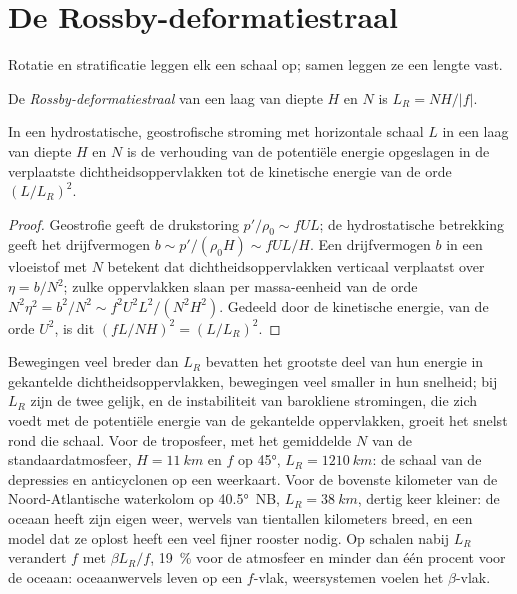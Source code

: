 \section{De Rossby-deformatiestraal}\label{sec:b3:gfd-foundations:rossby-radius}

Rotatie en stratificatie leggen elk een schaal op; samen leggen ze
een lengte vast.

\begin{definition}\label{def:b3:gfd-foundations:rossby-radius}
De \emph{Rossby-deformatiestraal}
van een laag van diepte $H$ en  $N$ is $L_R = NH/|f|$.
\end{definition}

\begin{proposition}\label{prop:b3:gfd-foundations:rossby-radius}
In een hydrostatische, geostrofische stroming met horizontale schaal $L$ in een laag van
diepte $H$ en  $N$ is de verhouding van de potentiële energie
opgeslagen in de verplaatste dichtheidsoppervlakken tot de kinetische energie
van de orde $(L/L_R)^2$.
\end{proposition}

\begin{proof}
Geostrofie geeft de drukstoring $p'/\rho_0 \sim fUL$; de
hydrostatische betrekking geeft het drijfvermogen $b \sim p'/(\rho_0H) \sim fUL/H$. Een
drijfvermogen $b$ in een vloeistof met  $N$ betekent dat dichtheidsoppervlakken
verticaal verplaatst over $\eta = b/N^2$; zulke oppervlakken slaan per
massa-eenheid van de orde $N^2\eta^2 = b^2/N^2 \sim f^2U^2L^2/(N^2H^2)$. Gedeeld
door de kinetische energie, van de orde $U^2$, is dit $(fL/NH)^2 = (L/L_R)^2$.
\end{proof}

Bewegingen veel breder dan $L_R$ bevatten het grootste deel van hun energie in gekantelde
dichtheidsoppervlakken, bewegingen veel smaller in hun snelheid; bij $L_R$ zijn de twee
gelijk, en de instabiliteit van barokliene stromingen, die zich voedt met de
potentiële energie van de gekantelde oppervlakken, groeit het snelst rond die schaal. Voor
de troposfeer, met het gemiddelde $N$ van de standaardatmosfeer, $H =
\qty{11}{km}$ en $f$ op \ang{45}, $L_R = \qty{1210}{km}$: de schaal van de
depressies en anticyclonen op een weerkaart. Voor de bovenste kilometer van
de Noord-Atlantische waterkolom op \ang{40.5}~NB, $L_R = \qty{38}{km}$, dertig
keer kleiner: de oceaan heeft zijn eigen weer, wervels van tientallen kilometers
breed, en een model dat ze oplost heeft een veel fijner rooster nodig. Op schalen
nabij $L_R$ verandert $f$ met $\beta L_R/f$, \qty{19}{\percent} voor de
atmosfeer en minder dan één procent voor de oceaan: oceaanwervels leven op een
$f$-vlak, weersystemen voelen het $\beta$-vlak.

